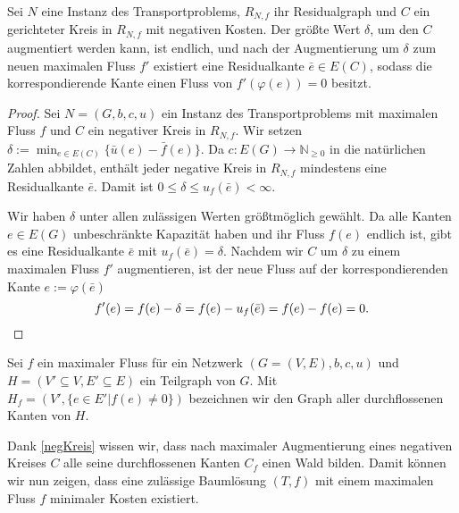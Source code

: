 \begin{lem}\label{negKreis}Sei $N$ eine Instanz des Transportproblems, $R_{N,f}$ ihr Residualgraph und $C$ ein gerichteter Kreis in $R_{N,f}$ mit negativen Kosten. Der größte Wert $\delta$, um den $C$ augmentiert werden kann, ist endlich, und nach der Augmentierung um $\delta$ zum neuen maximalen Fluss $f'$ existiert eine Residualkante $\bar{e}\in E(C)$, sodass die korrespondierende Kante einen Fluss von $f'(\varphi(e))=0$ besitzt. 
\end{lem}
\begin{proof}Sei $N=(G,b,c,u)$ ein Instanz des Transportproblems mit maximalen Fluss $f$ und $C$ ein negativer Kreis in $R_{N,f}$. Wir setzen $\delta:=\min_{e\in E(C)}\{\bar{u}(e)-\bar{f}(e)\}$. Da $c:E(G)\rightarrow\mathbb{N}_{\geq0}$ in die natürlichen Zahlen abbildet, enthält jeder negative Kreis in $R_{N,f}$ mindestens eine Residualkante $\bar{e}$. Damit ist $0\leq\delta\leq u_f(\bar{e})<\infty$.

Wir haben $\delta$ unter allen zulässigen Werten größtmöglich gewählt. Da alle Kanten $e\in E(G)$ unbeschränkte Kapazität haben und ihr Fluss $f(e)$ endlich ist, gibt es eine Residualkante $\bar{e}$ mit $u_f(\bar{e})=\delta$. Nachdem wir $C$ um $\delta$ zu einem maximalen Fluss $f'$ augmentieren, ist der neue Fluss auf der korrespondierenden Kante $e:=\varphi(\bar{e})$
\begin{equation*}
f'(e)=f(e)-\delta=f(e)-u_f(\bar{e})=f(e)-f(e)=0.\qedhere
\end{equation*}\end{proof}

\begin{nota}Sei $f$ ein maximaler Fluss für ein Netzwerk $(G=(V,E),b,c,u)$ und $H=(V'\subseteq V, E'\subseteq E)$ ein Teilgraph von $G$. Mit $H_f=(V',\{e\in E' | f(e) \neq 0\})$ bezeichnen wir den Graph aller durchflossenen Kanten von $H$.\end{nota}

Dank \cref{negKreis} wissen wir, dass nach maximaler Augmentierung eines negativen Kreises $C$ alle seine durchflossenen Kanten $C_f$ einen Wald bilden. Damit können wir nun zeigen, dass eine zulässige Baumlösung $(T,f)$ mit einem maximalen Fluss $f$ minimaler Kosten existiert.

